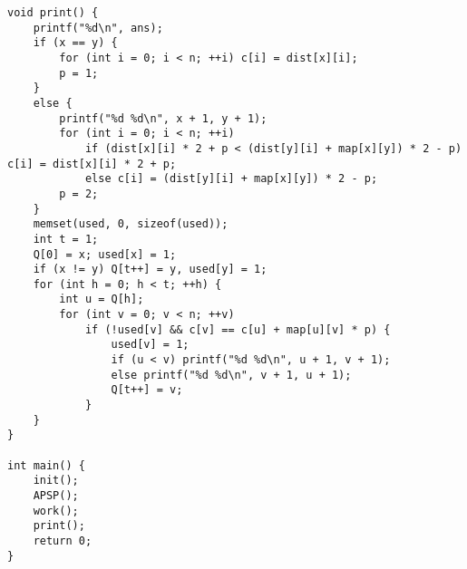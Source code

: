 \begin{verbatim}
void print() {
    printf("%d\n", ans);
    if (x == y) {
        for (int i = 0; i < n; ++i) c[i] = dist[x][i];
        p = 1;
    }
    else {
        printf("%d %d\n", x + 1, y + 1);
        for (int i = 0; i < n; ++i)
            if (dist[x][i] * 2 + p < (dist[y][i] + map[x][y]) * 2 - p) c[i] = dist[x][i] * 2 + p;
            else c[i] = (dist[y][i] + map[x][y]) * 2 - p;
        p = 2;
    }
    memset(used, 0, sizeof(used));
    int t = 1;
    Q[0] = x; used[x] = 1;
    if (x != y) Q[t++] = y, used[y] = 1;
    for (int h = 0; h < t; ++h) {
        int u = Q[h];
        for (int v = 0; v < n; ++v)
            if (!used[v] && c[v] == c[u] + map[u][v] * p) {
                used[v] = 1;
                if (u < v) printf("%d %d\n", u + 1, v + 1);
                else printf("%d %d\n", v + 1, u + 1);
                Q[t++] = v;
            }
    }
}

int main() {
    init();
    APSP();
    work();
    print();
    return 0;
}
\end{verbatim}
